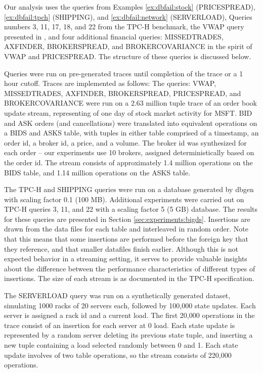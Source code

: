 Our analysis uses the queries from Examples \ref{ex:dbfail:stock} (PRICESPREAD),  \ref{ex:dbfail:tpch} (SHIPPING), and \ref{ex:dbfail:network} (SERVERLOAD), Queries numbers 3, 11, 17, 18, and 22 from the TPC-H\cite{tpch} benchmark, the VWAP query presented in \cite{kennedy-ahmad-koch-cidr:11}, and four additional financial queries: MISSEDTRADES, AXFINDER, BROKERSPREAD, and BROKERCOVARIANCE in the spirit of VWAP and PRICESPREAD.  The structure of these queries is discussed below.

Queries were run on pre-generated traces until completion of the trace or a 1 hour cutoff.  Traces are implemented as follows: The queries: VWAP, MISSEDTRADES, AXFINDER, BROKERSPREAD, PRICESPREAD, and BROKERCOVARIANCE were run on a 2.63 million tuple trace of an order book update stream, representing of one day of stock market activity for MSFT.  BID and ASK orders (and cancellations) were translated into equivalent operations on a BIDS and ASKS table, with tuples in either table comprised of a timestamp, an order id, a broker id, a price, and a volume.  The broker id was synthesized for each order -- our experiments use 10 brokers, assigned deterministically based on the order id.  The stream consists of approximately 1.4 million operations on the BIDS table, and 1.14 million operations on the ASKS table.

The TPC-H and SHIPPING queries were run on a database generated by dbgen\cite{tpch} with scaling factor 0.1 (100 MB).  Additional experiments were carried out on TPC-H queries 3, 11, and 22 with a scaling factor 5 (5 GB) database.  The results for these queries are presented in Section \ref{sec:experiments:bigds}.  Insertions are drawn from the data files for each table and interleaved in random order.  Note that this means that some insertions are performed before the foreign key that they reference, and that smaller datafiles finish earlier.  Although this is not expected behavior in a streaming setting, it serves to provide valuable insights about the difference between the performance characteristics of different types of insertions.  The size of each stream is as documented in the TPC-H specification\cite{tpch}.

The SERVERLOAD query was run on a synthetically generated dataset, simulating 1000 racks of 20 servers each, followed by 100,000 state updates.  Each server is assigned a rack id and a current load.  The first 20,000 operations in the trace consist of an insertion for each server at 0 load.  Each state update is represented by a random server deleting its previous state tuple, and inserting a new tuple containing a load selected randomly between 0 and 1.  Each state update involves of two table operations, so the stream consists of 220,000 operations.

